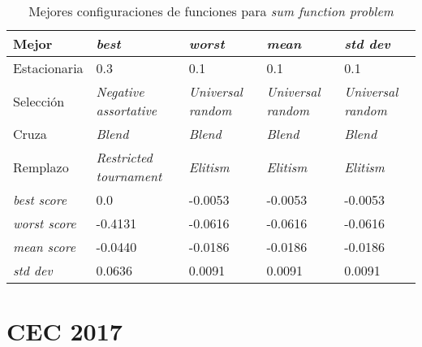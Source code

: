 \begin{table}[h!]
	\centering
	\begin{tabular}{|p{}|p{}|p{}|p{}|p{}|}
		\hline
			\textbf{Mejor} & \textbf{\textit{best}} & \textbf{\textit{worst}} & \textbf{\textit{mean}} & \textbf{\textit{std dev}}  \\ \hline
		Estacionaria & 0.3 & 0.1 & 0.1 & 0.1 \\
		Selección & \textit{Negative assortative} & \textit{Universal random} & \textit{Universal random}& \textit{Universal random} \\
		Cruza & \textit{Blend} & \textit{Blend} & \textit{Blend} &\textit{Blend} \\
		Remplazo & \textit{Restricted tournament} & \textit{Elitism} & \textit{Elitism} &\textit{Elitism} \\ \hline
		\textit{best score}& 0.0 & -0.0053 & -0.0053 & -0.0053 \\
		\textit{worst score}& -0.4131 & -0.0616 & -0.0616 & -0.0616 \\
		\textit{mean score}& -0.0440 & -0.0186 & -0.0186 &-0.0186 \\
		\textit{std dev}& 0.0636 & 0.0091 & 0.0091 &0.0091  \\ \hline
	\end{tabular}
	\caption{Mejores configuraciones de funciones para \textit{sum function problem}}
	\label{tab:res_sfp}
\end{table}

\section{CEC 2017}

